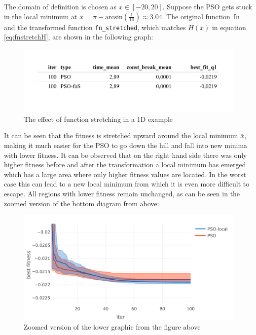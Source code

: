 \documentclass[
  oneside, a4paper, 12pt, openany]{book}
\theoremstyle{definition}
\theoremstyle{definition}
\theoremstyle{definition}
\theoremstyle{definition}
\theoremstyle{remark}
\begin{document}
The domain of definition is chosen as \(x \in [-20, 20]\). Suppose the PSO gets stuck in the local minimum at \(\bar{x} = \pi - \text{arcsin}(\frac{1}{10}) \approx 3.04\). The original function \texttt{fn} and the transformed function \texttt{fn\_stretched}, which matches \(H(x)\) in equation \eqref{eq:fnstretchH}, are shown in the following graph:

\begin{figure}[H]
\includegraphics{Master_Thesis_files/figure-latex/unnamed-chunk-11-1} \caption{The effect of function stretching in a 1D example}\label{fig:unnamed-chunk-11}
\end{figure}

It can be seen that the fitness is stretched upward around the local minimum \(\bar{x}\), making it much easier for the PSO to go down the hill and fall into new minima with lower fitness. It can be observed that on the right hand side there was only higher fitness before and after the transformation a local minimum has emerged which has a large area where only higher fitness values are located. In the worst case this can lead to a new local minimum from which it is even more difficult to escape. All regions with lower fitness remain unchanged, as can be seen in the zoomed version of the bottom diagram from above:

\begin{figure}[H]
\includegraphics{Master_Thesis_files/figure-latex/unnamed-chunk-12-1} \caption{Zoomed version of the lower graphic from the figure above}\label{fig:unnamed-chunk-12}
\end{figure}
\end{document}
